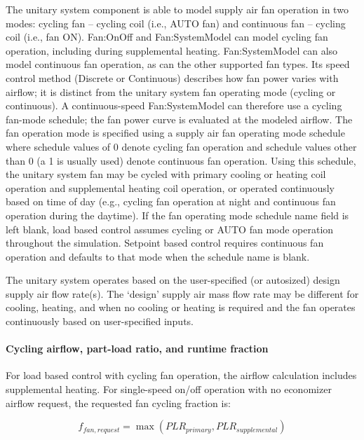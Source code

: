 The unitary system component is able to model supply air fan operation in two modes: cycling fan -- cycling coil (i.e., AUTO fan) and continuous fan -- cycling coil (i.e., fan ON). Fan:OnOff and Fan:SystemModel can model cycling fan operation, including during supplemental heating. Fan:SystemModel can also model continuous fan operation, as can the other supported fan types. Its speed control method (Discrete or Continuous) describes how fan power varies with airflow; it is distinct from the unitary system fan operating mode (cycling or continuous). A continuous-speed Fan:SystemModel can therefore use a cycling fan-mode schedule; the fan power curve is evaluated at the modeled airflow. The fan operation mode is specified using a supply air fan operating mode schedule where schedule values of 0 denote cycling fan operation and schedule values other than 0 (a 1 is usually used) denote continuous fan operation. Using this schedule, the unitary system fan may be cycled with primary cooling or heating coil operation and supplemental heating coil operation, or operated continuously based on time of day (e.g., cycling fan operation at night and continuous fan operation during the daytime). If the fan operating mode schedule name field is left blank, load based control assumes cycling or AUTO fan mode operation throughout the simulation. Setpoint based control requires continuous fan operation and defaults to that mode when the schedule name is blank.

The unitary system operates based on the user-specified (or autosized) design supply air flow rate(s). The `design' supply air mass flow rate may be different for cooling, heating, and when no cooling or heating is required and the fan operates continuously based on user-specified inputs.

\paragraph{Cycling airflow, part-load ratio, and runtime fraction}\label{unitary-system-cycling-airflow}

For load based control with cycling fan operation, the airflow calculation includes supplemental heating. For single-speed on/off operation with no economizer airflow request, the requested fan cycling fraction is:

\begin{equation}
f_{fan,request} = \max\left(PLR_{primary}, PLR_{supplemental}\right)
\end{equation}

